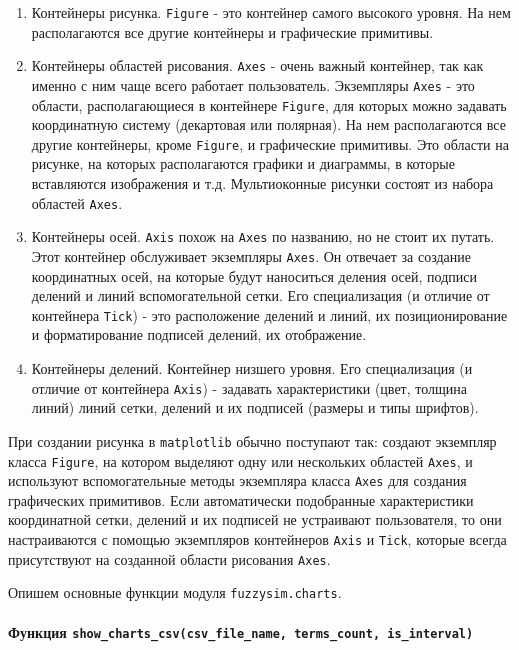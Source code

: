 \begin{enumerate}[label=\arabic*)]
	\item  Контейнеры рисунка. \lstinline!Figure! - это контейнер самого высокого уровня. На нем располагаются все другие контейнеры и графические примитивы.

	\item  Контейнеры областей рисования. \lstinline!Axes! - очень важный контейнер, так как именно с ним чаще всего работает пользователь. Экземпляры \lstinline!Axes! - это области, располагающиеся в контейнере \lstinline!Figure!, для которых можно задавать координатную систему (декартовая или полярная). На нем располагаются все другие контейнеры, кроме \lstinline!Figure!, и графические примитивы. Это области на рисунке, на которых располагаются графики и диаграммы, в которые вставляются изображения и т.д. Мультиоконные рисунки состоят из набора областей \lstinline!Axes!.

	\item  Контейнеры осей. \lstinline!Axis! похож на \lstinline!Axes! по названию, но не стоит их путать. Этот контейнер обслуживает экземпляры \lstinline!Axes!. Он отвечает за создание координатных осей, на которые будут наноситься деления осей, подписи делений и линий вспомогательной сетки. Его специализация (и отличие от контейнера \lstinline!Tick!) - это расположение делений и линий, их позиционирование и форматирование подписей делений, их отображение.

	\item  Контейнеры делений. Контейнер низшего уровня. Его специализация (и отличие от контейнера \lstinline!Axis!) - задавать характеристики (цвет, толщина линий) линий сетки, делений и их подписей (размеры и типы шрифтов).
\end{enumerate}

При создании рисунка в \lstinline!matplotlib! обычно поступают так: создают экземпляр класса \lstinline!Figure!, на котором выделяют одну или нескольких областей \lstinline!Axes!, и используют вспомогательные методы экземпляра класса \lstinline!Axes! для создания графических примитивов. Если автоматически подобранные характеристики координатной сетки, делений и их подписей не устраивают пользователя, то они настраиваются с помощью экземпляров контейнеров \lstinline!Axis! и \lstinline!Tick!, которые всегда присутствуют на созданной области рисования \lstinline!Axes!.

Опишем основные функции модуля \lstinline!fuzzysim.charts!.

\paragraph{Функция \lstinline!show_charts_csv(csv_file_name, terms_count, is_interval)!}

